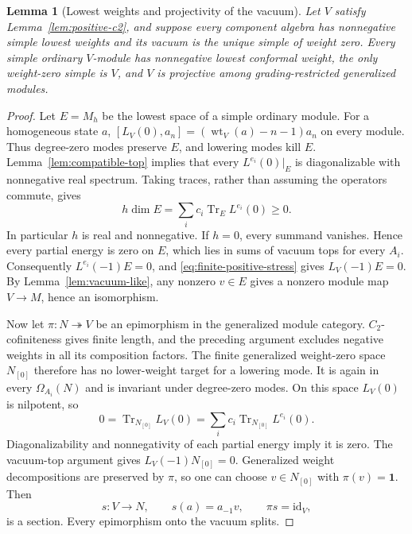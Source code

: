 \documentclass[11pt,a4paper]{article}
\newtheorem{lemma}[theorem]{Lemma}
\theoremstyle{definition}
\begin{document}
\begin{lemma}[Lowest weights and projectivity of the vacuum]
\label{lem:vacuum-projective}
Let $V$ satisfy Lemma~\ref{lem:positive-c2}, and suppose every component
algebra has nonnegative simple lowest weights and its vacuum is the
unique simple of weight zero. Every simple ordinary $V$-module has
nonnegative lowest conformal weight, the only weight-zero simple is
$V$, and $V$ is projective among grading-restricted generalized modules.
\end{lemma}
\begin{proof}
Let $E=M_h$ be the lowest space of a simple ordinary module.
For a homogeneous state $a$,
$[L_V(0),a_n]=(\operatorname{wt}_V(a)-n-1)a_n$ on every module.
Thus degree-zero modes preserve $E$, and lowering modes kill $E$.
Lemma~\ref{lem:compatible-top} implies that every
$L^{e_i}(0)|_E$ is diagonalizable with nonnegative real spectrum.
Taking traces, rather than assuming the operators commute, gives
\begin{equation}
 h\dim E=\sum_i c_i\operatorname{Tr}_E L^{e_i}(0)\ge0.
 \label{eq:top-trace}
\end{equation}
In particular $h$ is real and nonnegative. If $h=0$, every summand vanishes.
Hence every partial energy is zero
on $E$, which lies in sums of vacuum tops for every $A_i$. Consequently
$L^{e_i}(-1)E=0$, and \eqref{eq:finite-positive-stress} gives
$L_V(-1)E=0$. By Lemma~\ref{lem:vacuum-like}, any nonzero $v\in E$
gives a nonzero module map $V\to M$, hence an
isomorphism.

Now let $\pi:N\twoheadrightarrow V$ be an epimorphism in the generalized
module category. $C_2$-cofiniteness gives finite length, and the preceding
argument excludes negative weights in all its composition factors.
The finite generalized weight-zero space $N_{[0]}$ therefore has no
lower-weight target for a lowering mode. It is again in every
$\Omega_{A_i}(N)$ and is invariant under degree-zero modes. On this
space $L_V(0)$ is nilpotent, so
\[
 0=\operatorname{Tr}_{N_{[0]}}L_V(0)
  =\sum_i c_i\operatorname{Tr}_{N_{[0]}}L^{e_i}(0).
\]
Diagonalizability and nonnegativity of each partial energy imply it is
zero. The vacuum-top argument gives $L_V(-1)N_{[0]}=0$. Generalized
weight decompositions are preserved by $\pi$, so one can choose
$v\in N_{[0]}$ with $\pi(v)=\mathbf1$. Then
\[
 s:V\longrightarrow N,\qquad s(a)=a_{-1}v,
 \qquad \pi s=\mathrm{id}_V,
\]
is a section. Every epimorphism onto the vacuum splits.
\end{proof}
\end{document}
